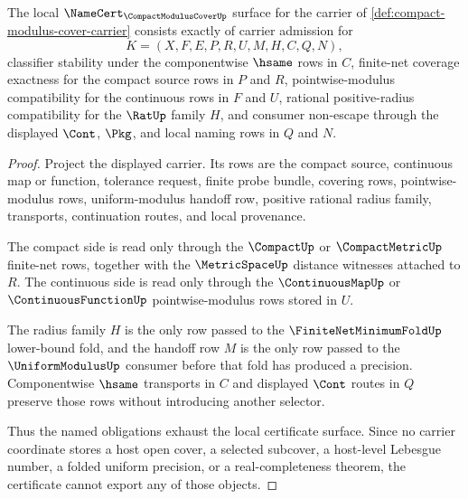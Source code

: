 \begin{theorem}
\label{thm:compact-modulus-cover-namecert-obligations}
The local $\NameCert_{\CompactModulusCoverUp}$ surface for the carrier of \autoref{def:compact-modulus-cover-carrier} consists exactly of carrier admission for
$$
K=(X,F,E,P,R,U,M,H,C,Q,N),
$$
classifier stability under the componentwise $\hsame$ rows in $C$, finite-net coverage exactness for the compact source rows in $P$ and $R$, pointwise-modulus compatibility for the continuous rows in $F$ and $U$, rational positive-radius compatibility for the $\RatUp$ family $H$, and consumer non-escape through the displayed $\Cont$, $\Pkg$, and local naming rows in $Q$ and $N$.
\end{theorem}
\begin{proof}
Project the displayed carrier. Its rows are the compact source, continuous map or function, tolerance request, finite probe bundle, covering rows, pointwise-modulus rows, uniform-modulus handoff row, positive rational radius family, transports, continuation routes, and local provenance.

The compact side is read only through the $\CompactUp$ or $\CompactMetricUp$ finite-net rows, together with the $\MetricSpaceUp$ distance witnesses attached to $R$. The continuous side is read only through the $\ContinuousMapUp$ or $\ContinuousFunctionUp$ pointwise-modulus rows stored in $U$.

The radius family $H$ is the only row passed to the $\FiniteNetMinimumFoldUp$ lower-bound fold, and the handoff row $M$ is the only row passed to the $\UniformModulusUp$ consumer before that fold has produced a precision. Componentwise $\hsame$ transports in $C$ and displayed $\Cont$ routes in $Q$ preserve those rows without introducing another selector.

Thus the named obligations exhaust the local certificate surface. Since no carrier coordinate stores a host open cover, a selected subcover, a host-level Lebesgue number, a folded uniform precision, or a real-completeness theorem, the certificate cannot export any of those objects.
\end{proof}

